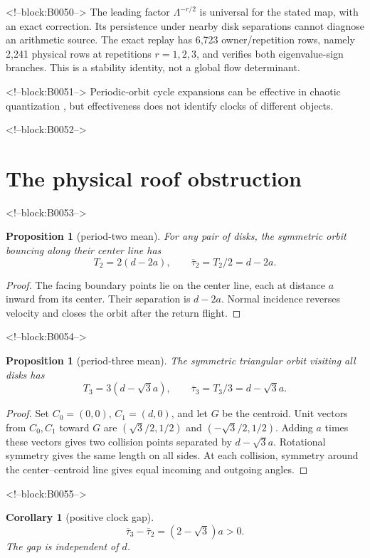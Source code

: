 \documentclass[11pt,a4paper]{article}
\newtheorem{proposition}[theorem]{Proposition}
\newtheorem{corollary}[theorem]{Corollary}
\theoremstyle{definition}
\theoremstyle{remark}
\begin{document}
<!--block:B0050-->
The leading factor \(\Lambda^{-r/2}\) is universal for the stated map, with an exact correction. Its persistence under nearby disk separations cannot diagnose an arithmetic source. The exact replay has 6,723 owner/repetition rows, namely 2,241 physical rows at repetitions \(r=1,2,3\), and verifies both eigenvalue-sign branches. This is a stability identity, not a global flow determinant.

<!--block:B0051-->
Periodic-orbit cycle expansions can be effective in chaotic quantization \citep[pp.~823--826]{CvitanovicEckhardt1989}, but effectiveness does not identify clocks of different objects.

<!--block:B0052-->
\section{The physical roof obstruction}

<!--block:B0053-->
\begin{proposition}[period-two mean]\label{prop:t2}
For any pair of disks, the symmetric orbit bouncing along their center line has
\[
 T_2=2(d-2a),\qquad \overline{\tau}_2=T_2/2=d-2a.
\]
\end{proposition}
\begin{proof}
The facing boundary points lie on the center line, each at distance \(a\) inward from its center. Their separation is \(d-2a\). Normal incidence reverses velocity and closes the orbit after the return flight.
\end{proof}

<!--block:B0054-->
\begin{proposition}[period-three mean]\label{prop:t3}
The symmetric triangular orbit visiting all disks has
\[
 T_3=3(d-\sqrt3a),\qquad \overline{\tau}_3=T_3/3=d-\sqrt3a.
\]
\end{proposition}
\begin{proof}
Set \(C_0=(0,0)\), \(C_1=(d,0)\), and let \(G\) be the centroid. Unit vectors from \(C_0,C_1\) toward \(G\) are
\((\sqrt3/2,1/2)\) and \((-\sqrt3/2,1/2)\). Adding \(a\) times these vectors gives two collision points separated by \(d-\sqrt3a\). Rotational symmetry gives the same length on all sides. At each collision, symmetry around the center--centroid line gives equal incoming and outgoing angles.
\end{proof}

<!--block:B0055-->
\begin{corollary}[positive clock gap]\label{cor:gap}
\[
 \overline{\tau}_3-\overline{\tau}_2=(2-\sqrt3)a>0.
\]
The gap is independent of \(d\).
\end{corollary}
\end{document}

